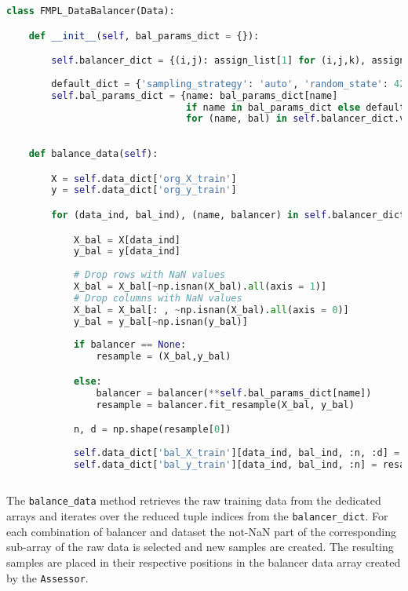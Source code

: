 \begin{lstlisting}[language=Python, numbers=none]
class FMPL_DataBalancer(Data):

    def __init__(self, bal_params_dict = {}):

        self.balancer_dict = {(i,j): assign_list[1] for (i,j,k), assign_list in self.data_dict['assignment_dict'].items()}
        
        default_dict = {'sampling_strategy': 'auto', 'random_state': 42}
        self.bal_params_dict = {name: bal_params_dict[name]
                                if name in bal_params_dict else default_dict
                                for (name, bal) in self.balancer_dict.values()}
        
     
    def balance_data(self):

        X = self.data_dict['org_X_train']
        y = self.data_dict['org_y_train']

        for (data_ind, bal_ind), (name, balancer) in self.balancer_dict.items():

            X_bal = X[data_ind]
            y_bal = y[data_ind]
            
            # Drop rows with NaN values
            X_bal = X_bal[~np.isnan(X_bal).all(axis = 1)]
            # Drop columns with NaN values
            X_bal = X_bal[: , ~np.isnan(X_bal).all(axis = 0)]
            y_bal = y_bal[~np.isnan(y_bal)]
            
            if balancer == None:
                resample = (X_bal,y_bal)

            else:
                balancer = balancer(**self.bal_params_dict[name])
                resample = balancer.fit_resample(X_bal, y_bal)

            n, d = np.shape(resample[0])
                        
            self.data_dict['bal_X_train'][data_ind, bal_ind, :n, :d] = resample[0]
            self.data_dict['bal_y_train'][data_ind, bal_ind, :n] = resample[1]
            
\end{lstlisting}

The \texttt{balance\_data} method retrieves the raw training data from the dedicated arrays and iterates over the reduced tuple indices from the \texttt{balancer\_dict}.
For each combination of balancer and dataset the not-NaN part of the corresponding sub-array of the raw data is selected and new samples are created. 
The resulting samples are placed in their respective positions in the balancer data array created by the \texttt{Assessor}.

